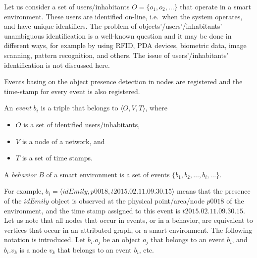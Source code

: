 \documentclass[runningheads,a4paper]{llncs}
\begin{document}
Let us consider a set of users/inhabitants
$O=\{ o_{1},o_{2},... \}$
that operate in a smart environment.
These users are identified on-line,
i.e.\ when the system operates, and have unique identifiers.
The problem of objects'/users'/inhabitants' unambiguous identification is
a well-known question and it may be done in different ways,
for example by using RFID, PDA devices, biometric data, image scanning, pattern recognition, and others.
The issue of users'/inhabitants' identification is not discussed here.

Events basing on the object presence detection in nodes are registered and
the time-stamp for every event is also registered.
\begin{definition}
\label{def:event}
An \emph{event} $b_i$ is a triple that belongs to $\langle O,V,T \rangle$,
where
\begin{itemize}
\item $O$ is a set of identified users/inhabitants,
\item $V$ is a node of a network, and
\item $T$ is a set of time stamps.
\end{itemize}
A \emph{behavior} $B$ of a smart environment is a set of events $\{ b_{1}, b_{2}, \dots, b_i, \ldots \}$.
\end{definition}
For example,
$b_{i}=\langle idEmily,p0018,t2015.02.11.09.30.15 \rangle$
means that the presence of the $idEmily$ object is observed at
the physical point/area/node $p0018$ of the environment,
and the time stamp assigned to this event is $t2015.02.11.09.30.15$.
Let us note that all nodes that occur in events, or in a behavior,
are equivalent to vertices that occur in an attributed graph,
or a smart environment.
The following notation is introduced.
Let $b_{i}.o_{j}$ be an object $o_{j}$ that belongs to an event $b_i$,
and $b_{i}.v_{k}$ is a node $v_{k}$ that belongs to an event $b_i$, etc.
\end{document}
